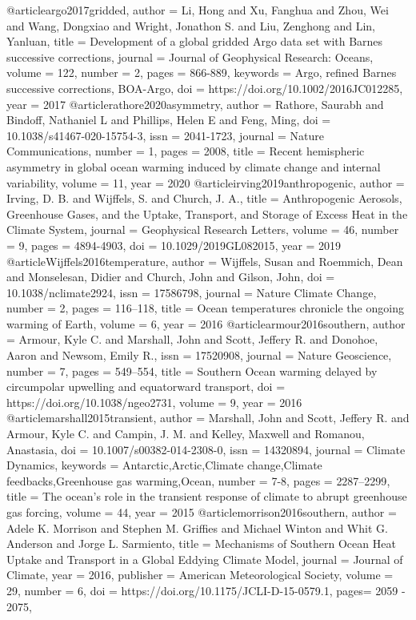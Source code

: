 @article{argo2017gridded,
author = {Li, Hong and Xu, Fanghua and Zhou, Wei and Wang, Dongxiao and Wright, Jonathon S. and Liu, Zenghong and Lin, Yanluan},
title = {{Development of a global gridded Argo data set with Barnes successive corrections}},
journal = {Journal of Geophysical Research: Oceans},
volume = {122},
number = {2},
pages = {866-889},
keywords = {Argo, refined Barnes successive corrections, BOA-Argo},
doi = {https://doi.org/10.1002/2016JC012285},
year = {2017}
}
@article{rathore2020asymmetry,
 author = {Rathore, Saurabh and Bindoff, Nathaniel L and Phillips, Helen E and Feng, Ming},
 doi = {10.1038/s41467-020-15754-3},
 issn = {2041-1723},
 journal = {Nature Communications},
 number = {1},
 pages = {2008},
 title = {{Recent hemispheric asymmetry in global ocean warming induced by climate change and internal variability}},
 volume = {11},
 year = {2020}
}
@article{irving2019anthropogenic,
 author = {Irving, D. B. and Wijffels, S. and Church, J. A.},
 title = {{Anthropogenic Aerosols, Greenhouse Gases, and the Uptake, Transport, and Storage of Excess Heat in the Climate System}},
 journal = {Geophysical Research Letters},
 volume = {46},
 number = {9},
 pages = {4894-4903},
 doi = {10.1029/2019GL082015},
 year = {2019}
}
@article{Wijffels2016temperature,
author = {Wijffels, Susan and Roemmich, Dean and Monselesan, Didier and Church, John and Gilson, John},
doi = {10.1038/nclimate2924},
issn = {17586798},
journal = {Nature Climate Change},
number = {2},
pages = {116--118},
title = {{Ocean temperatures chronicle the ongoing warming of Earth}},
volume = {6},
year = {2016}
}
@article{armour2016southern,
 author = {Armour, Kyle C. and Marshall, John and Scott, Jeffery R. and Donohoe, Aaron and Newsom, Emily R.},
 issn = {17520908},
 journal = {Nature Geoscience},
 number = {7},
 pages = {549--554},
 title = {{Southern Ocean warming delayed by circumpolar upwelling and equatorward transport}},
 doi = {https://doi.org/10.1038/ngeo2731},
 volume = {9},
 year = {2016}
}
@article{marshall2015transient,
 author = {Marshall, John and Scott, Jeffery R. and Armour, Kyle C. and Campin, J. M. and Kelley, Maxwell and Romanou, Anastasia},
 doi = {10.1007/s00382-014-2308-0},
 issn = {14320894},
 journal = {Climate Dynamics},
 keywords = {Antarctic,Arctic,Climate change,Climate feedbacks,Greenhouse gas warming,Ocean},
 number = {7-8},
 pages = {2287--2299},
 title = {{The ocean's role in the transient response of climate to abrupt greenhouse gas forcing}},
 volume = {44},
 year = {2015}
}
@article{morrison2016southern,
 author = {Adele K. Morrison and Stephen M. Griffies and Michael Winton and Whit G. Anderson and Jorge L. Sarmiento},
 title = {{Mechanisms of Southern Ocean Heat Uptake and Transport in a Global Eddying Climate Model}},
 journal = {Journal of Climate},
 year = {2016},
 publisher = {American Meteorological Society},
 volume = {29},
 number = {6},
 doi = {https://doi.org/10.1175/JCLI-D-15-0579.1},
 pages=      {2059 - 2075},
}
